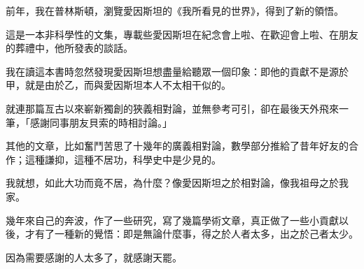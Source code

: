 \begin{acknowledgementszh}
前年，我在普林斯頓，瀏覽愛因斯坦的《我所看見的世界》，得到了新的領悟。

這是一本非科學性的文集，專載些愛因斯坦在紀念會上啦、在歡迎會上啦、在朋友的葬禮中，他所發表的談話。

我在讀這本書時忽然發現愛因斯坦想盡量給聽眾一個印象：即他的貢獻不是源於甲，就是由於乙，而與愛因斯坦本人不太相干似的。

就連那篇亙古以來嶄新獨創的狹義相對論，並無參考可引，卻在最後天外飛來一筆，「感謝同事朋友貝索的時相討論。」

其他的文章，比如奮鬥苦思了十幾年的廣義相對論，數學部分推給了昔年好友的合作；這種謙抑，這種不居功，科學史中是少見的。

我就想，如此大功而竟不居，為什麼？像愛因斯坦之於相對論，像我祖母之於我家。

幾年來自己的奔波，作了一些研究，寫了幾篇學術文章，真正做了一些小貢獻以後，才有了一種新的覺悟：即是無論什麼事，得之於人者太多，出之於己者太少。

因為需要感謝的人太多了，就感謝天罷。
\end{acknowledgementszh}

